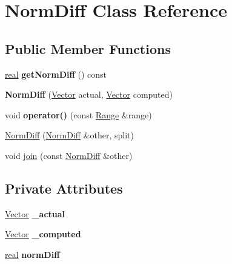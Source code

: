 \hypertarget{class_norm_diff}{
\section{NormDiff Class Reference}
\label{class_norm_diff}
}
\subsection*{Public Member Functions}
\begin{CompactItemize}
\item 
\hypertarget{class_norm_diff_47bd32e56a26272eaad47a4839448312}{
\hyperlink{cowichan_8hpp_4d521b2c54a1f6312cc8fa04827eaf98}{real} \textbf{getNormDiff} () const }
\label{class_norm_diff_47bd32e56a26272eaad47a4839448312}

\item 
\hypertarget{class_norm_diff_2f6ff2bc440755f8ac2350b5185b5423}{
\textbf{NormDiff} (\hyperlink{cowichan_8hpp_02bc1553e241b9b33408482658b3c355}{Vector} actual, \hyperlink{cowichan_8hpp_02bc1553e241b9b33408482658b3c355}{Vector} computed)}
\label{class_norm_diff_2f6ff2bc440755f8ac2350b5185b5423}

\item 
\hypertarget{class_norm_diff_44066147e706abbfce8e16fc92e0affc}{
void \textbf{operator()} (const \hyperlink{cowichan__tbb_8hpp_8e2057f725b08f3a15513c378a453a47}{Range} \&range)}
\label{class_norm_diff_44066147e706abbfce8e16fc92e0affc}

\item 
\hyperlink{class_norm_diff_edef38012c44577650ccb47a55177eee}{NormDiff} (\hyperlink{class_norm_diff}{NormDiff} \&other, split)
\item 
void \hyperlink{class_norm_diff_8a3ce83486dfa068fbc4d3601a6442b1}{join} (const \hyperlink{class_norm_diff}{NormDiff} \&other)
\end{CompactItemize}
\subsection*{Private Attributes}
\begin{CompactItemize}
\item 
\hypertarget{class_norm_diff_f4dd514a2fb97d4e4742232b2d6f4930}{
\hyperlink{cowichan_8hpp_02bc1553e241b9b33408482658b3c355}{Vector} \textbf{\_\-actual}}
\label{class_norm_diff_f4dd514a2fb97d4e4742232b2d6f4930}

\item 
\hypertarget{class_norm_diff_c6815c7be114269afb88e6932a001496}{
\hyperlink{cowichan_8hpp_02bc1553e241b9b33408482658b3c355}{Vector} \textbf{\_\-computed}}
\label{class_norm_diff_c6815c7be114269afb88e6932a001496}

\item 
\hypertarget{class_norm_diff_99c21620f91d9f917bb0745a284275b3}{
\hyperlink{cowichan_8hpp_4d521b2c54a1f6312cc8fa04827eaf98}{real} \textbf{normDiff}}
\label{class_norm_diff_99c21620f91d9f917bb0745a284275b3}

\end{CompactItemize}


